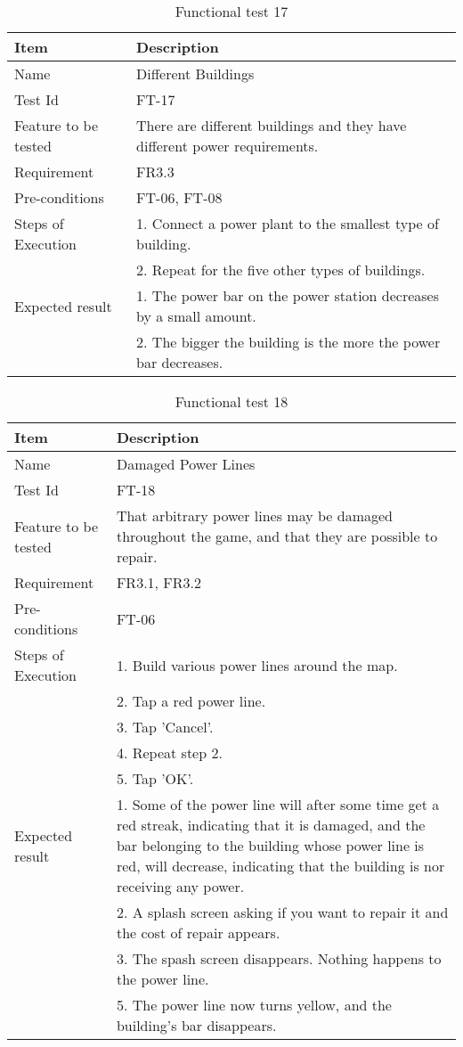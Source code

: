 \begin{table}[H]
\centering
	\begin{tabular}{ l | p{8cm} }
		\hline
		{\bf Item} & {\bf Description} \\ \hline
		Name & Different Buildings \\ 
		Test Id & FT-17 \\ 
		Feature to be tested & There are different buildings and they have different power requirements. \\ 
		Requirement & FR3.3 \\ 
		Pre-conditions & FT-06, FT-08 \\ 
		Steps of Execution & 1. Connect a power plant to the smallest type of building. \\
		& 2. Repeat for the five other types of buildings. \\
		Expected result & 1. The power bar on the power station decreases by a small amount. \\
		& 2. The bigger the building is the more the power bar decreases. \\
	\end{tabular}
	\caption{Functional test 17}
\end{table}

\begin{table}[H]
\centering
	\begin{tabular}{ l | p{8cm} }
		\hline
		{\bf Item} & {\bf Description} \\ \hline
		Name & Damaged Power Lines \\ 
		Test Id & FT-18 \\ 
		Feature to be tested & That arbitrary power lines may be damaged throughout the game, and that they are possible to repair. \\ 
		Requirement & FR3.1, FR3.2  \\ 
		Pre-conditions & FT-06 \\ 
		Steps of Execution & 1. Build various power lines around the map. \\ 
		& 2. Tap a red power line. \\
		& 3. Tap 'Cancel'. \\
		& 4. Repeat step 2. \\
		& 5. Tap 'OK'. \\
		Expected result & 1. Some of the power line will after some time get a red streak, indicating that it is damaged, and the bar belonging to the building whose power line is red, will decrease, indicating that the building is nor receiving any power. \\
		& 2. A splash screen asking if you want to repair it and the cost of repair appears. \\
		& 3. The spash screen disappears. Nothing happens to the power line. \\
		& 5. The power line now turns yellow, and the building's bar disappears. \\
	\end{tabular}
	\caption{Functional test 18}
\end{table}


